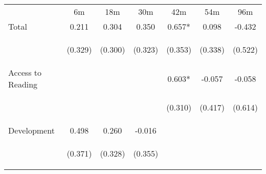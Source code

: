 \begin{tabular}{lcccccc}
\hline \noalign{\smallskip} & 6m & 18m & 30m & 42m & 54m & 96m\\
\noalign{\smallskip}\hline \noalign{\smallskip}Total & 0.211 & 0.304 & 0.350 & 0.657* & 0.098 & -0.432\\
 & \begin{footnotesize}(0.329)\end{footnotesize} & \begin{footnotesize}(0.300)\end{footnotesize} & \begin{footnotesize}(0.323)\end{footnotesize} & \begin{footnotesize}(0.353)\end{footnotesize} & \begin{footnotesize}(0.338)\end{footnotesize} & \begin{footnotesize}(0.522)\end{footnotesize}\\
\noalign{\smallskip}Access to Reading &  &  &  & 0.603* & -0.057 & -0.058\\
 & \begin{footnotesize}\end{footnotesize} & \begin{footnotesize}\end{footnotesize} & \begin{footnotesize}\end{footnotesize} & \begin{footnotesize}(0.310)\end{footnotesize} & \begin{footnotesize}(0.417)\end{footnotesize} & \begin{footnotesize}(0.614)\end{footnotesize}\\
\noalign{\smallskip}Development & 0.498 & 0.260 & -0.016 &  &  & \\
 & \begin{footnotesize}(0.371)\end{footnotesize} & \begin{footnotesize}(0.328)\end{footnotesize} & \begin{footnotesize}(0.355)\end{footnotesize} & \begin{footnotesize}\end{footnotesize} & \begin{footnotesize}\end{footnotesize} & \begin{footnotesize}\end{footnotesize}\\

\end{tabular}
